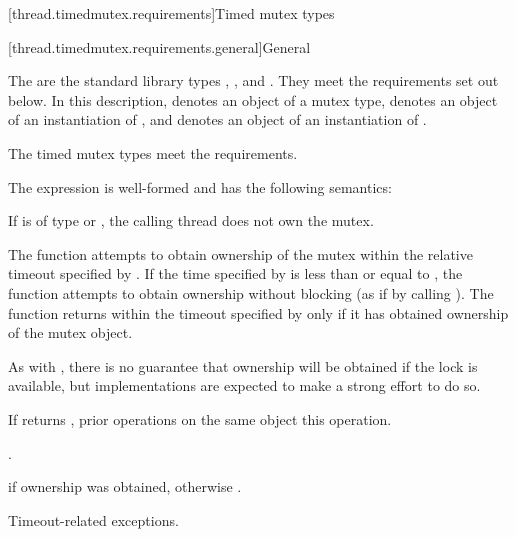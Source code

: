 [thread.timedmutex.requirements]{Timed mutex types}

[thread.timedmutex.requirements.general]{General}

\pnum
The  are the standard library types ,
, and . They
meet the requirements set out below.
In this description,  denotes an object of a mutex type,
 denotes an object of an
instantiation of , and  denotes an
object of an
instantiation of .
\begin{note}
The timed mutex types meet the 
requirements.
\end{note}

\pnum
The expression  is well-formed
and has the following semantics:
\begin{itemdescr}
\pnum
\expects
If  is of type  or
, the calling thread does not
own the mutex.

\pnum
\effects
The function attempts to obtain ownership of the mutex within the
relative timeout
specified by . If the time specified by  is less than or
equal to , the function attempts to obtain ownership without blocking (as if by calling
). The function returns within the timeout specified by
 only if it has obtained ownership of the mutex object.
\begin{note}
As
with , there is no guarantee that ownership will be obtained if the
lock is available, but implementations are expected to make a strong effort to do so.
\end{note}

\pnum
\sync
If  returns , prior  operations
on the same object  this operation.

\pnum
\returntype {}.

\pnum
\returns
{} if ownership was obtained, otherwise .

\pnum
\throws
Timeout-related exceptions.
\end{itemdescr}

